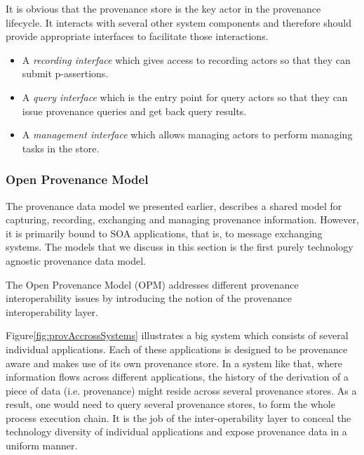 It is obvious that the provenance store is the key actor in the provenance lifecycle. It interacts with several other system components and therefore should provide appropriate interfaces to facilitate those interactions.

\begin{itemize}
  \item
        A \emph{recording interface} which gives access to recording actors so that they can submit p-assertions.
  \item
        A \emph{query interface} which is the entry point for query actors so that they can issue provenance queries and get back query results.
  \item
        A \emph{management interface} which allows managing actors to perform managing tasks in the store.
\end{itemize}


\subsubsection{Open Provenance Model}
The provenance data model we presented earlier, describes a shared model for capturing, recording, exchanging and managing provenance information. However, it is primarily bound to SOA applications, that is, to message exchanging systems. The models that we discuss in this section is the first purely technology agnostic provenance data model.

The Open Provenance Model (OPM)\cite{reference13}\cite{reference34} addresses different provenance interoperability issues by introducing the notion of the provenance interoperability layer\cite{reference1}.

Figure\ref{fig:provAccrossSystems} illustrates a big system which consists of several individual applications. Each of these applications is designed to be provenance aware and makes use of its own provenance store. In a system like that, where information flows across different applications, the history of the derivation of a piece of data (i.e. provenance) might reside across several provenance stores. As a result, one would need to query several provenance stores, to form the whole process execution chain. It is the job of the inter-operability layer to conceal the technology diversity of individual applications and expose provenance data in a uniform manner.

